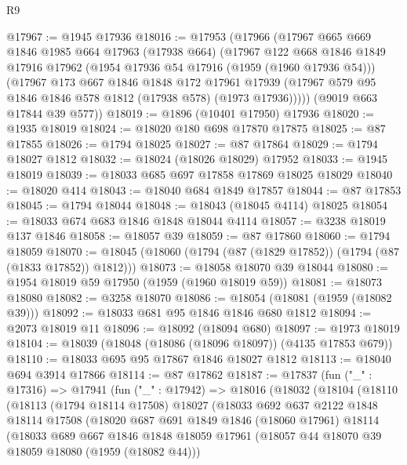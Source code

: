 \begin{lexlean}{R9}
\begin{coremodule}
@17967 := @1945 @17936
@18016 := @17953
    (@17966
      (@17967
        @665
        @669
        @1846
        @1985
        @664
        @17963
        (@17938 @664)
        (@17967
          @122
          @668
          @1846
          @1849
          @17916
          @17962
          (@1954 @17936 @54 @17916 (@1959 (@1960 @17936 @54)))
          (@17967
            @173
            @667
            @1846
            @1848
            @172
            @17961
            @17939
            (@17967 @579 @95 @1846 @1846 @578 @1812 (@17938 @578) (@1973 @17936)))))
      (@9019 @663 @17844 @39 @577))
@18019 := @1896 (@10401 @17950) @17936
@18020 := @1935 @18019
@18024 := @18020 @180 @698 @17870 @17875
@18025 := @87 @17855
@18026 := @1794 @18025
@18027 := @87 @17864
@18029 := @1794 @18027 @1812
@18032 := @18024 (@18026 @18029) @17952
@18033 := @1945 @18019
@18039 := @18033 @685 @697 @17858 @17869 @18025 @18029
@18040 := @18020 @414
@18043 := @18040 @684 @1849 @17857
@18044 := @87 @17853
@18045 := @1794 @18044
@18048 := @18043 (@18045 @4114) @18025
@18054 := @18033 @674 @683 @1846 @1848 @18044 @4114
@18057 := @3238 @18019 @137 @1846
@18058 := @18057 @39
@18059 := @87 @17860
@18060 := @1794 @18059
@18070 := @18045 (@18060 (@1794 (@87 (@1829 @17852)) (@1794 (@87 (@1833 @17852)) @1812)))
@18073 := @18058 @18070 @39 @18044
@18080 := @1954 @18019 @59 @17950 (@1959 (@1960 @18019 @59))
@18081 := @18073 @18080
@18082 := @3258 @18070
@18086 := @18054 (@18081 (@1959 (@18082 @39)))
@18092 := @18033 @681 @95 @1846 @1846 @680 @1812
@18094 := @2073 @18019 @11
@18096 := @18092 (@18094 @680)
@18097 := @1973 @18019
@18104 := @18039 (@18048 (@18086 (@18096 @18097)) (@4135 @17853 @679))
@18110 := @18033 @695 @95 @17867 @1846 @18027 @1812
@18113 := @18040 @694 @3914 @17866
@18114 := @87 @17862
@18187 := @17837
    (fun ("_" : @17316) =>
    @17941
      (fun ("_" : @17942) =>
      @18016
        (@18032
          (@18104
            (@18110
              (@18113
                (@1794 @18114 @17508)
                @18027
                (@18033
                  @692
                  @637
                  @2122
                  @1848
                  @18114
                  @17508
                  (@18020
                    @687
                    @691
                    @1849
                    @1846
                    (@18060 @17961)
                    @18114
                    (@18033
                      @689
                      @667
                      @1846
                      @1848
                      @18059
                      @17961
                      (@18057 @44 @18070 @39 @18059 @18080 (@1959 (@18082 @44)))

\end{coremodule}
\end{lexlean}
